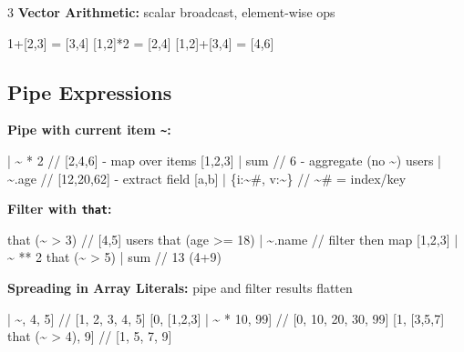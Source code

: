 \documentclass[8pt,landscape,a4paper,oneside]{article}
\newenvironment{Shaded}{%
  \begin{snugshade}%
  \vspace{0.4\baselineskip}%
  \fontsize{9}{10}\selectfont%
  \setlength{\parskip}{0pt}%
  \setlength{\topsep}{0pt}%
  \setlength{\partopsep}{0pt}%
}{%
  \vspace{0.01\baselineskip}%
  \end{snugshade}%
}
\newcommand{\NormalTok}[1]{#1}
\begin{document}
\begin{multicols*}{3}
\textbf{Vector Arithmetic:} scalar broadcast, element-wise ops

\begin{Shaded}
\begin{Highlighting}[]
\NormalTok{1+[2,3] = [3,4]  [1,2]*2 = [2,4]  [1,2]+[3,4] = [4,6]}
\end{Highlighting}
\end{Shaded}

\subsection{Pipe Expressions}\label{pipe-expressions}

\textbf{Pipe \texttt{\textbar{}} with current item
\texttt{\textasciitilde{}}:}

\begin{Shaded}
\begin{Highlighting}[]
\NormalTok{[1,2,3] | \textasciitilde{} * 2          // [2,4,6] {-} map over items}
\NormalTok{[1,2,3] | sum            // 6 {-} aggregate (no \textasciitilde{})}
\NormalTok{users | \textasciitilde{}.age            // [12,20,62] {-} extract field}
\NormalTok{[\textquotesingle{}a\textquotesingle{},\textquotesingle{}b\textquotesingle{}] | \{i:\textasciitilde{}\#, v:\textasciitilde{}\}  // \textasciitilde{}\# = index/key}
\end{Highlighting}
\end{Shaded}

\textbf{Filter with \texttt{that}:}

\begin{Shaded}
\begin{Highlighting}[]
\NormalTok{[1,2,3,4,5] that (\textasciitilde{} \textgreater{} 3)         // [4,5]}
\NormalTok{users that (age \textgreater{}= 18) | \textasciitilde{}.name  // filter then map}
\NormalTok{[1,2,3] | \textasciitilde{} ** 2 that (\textasciitilde{} \textgreater{} 5) | sum // 13 (4+9)}
\end{Highlighting}
\end{Shaded}

\textbf{Spreading in Array Literals:} pipe and filter results flatten

\begin{Shaded}
\begin{Highlighting}[]
\NormalTok{[1, [2,3] | \textasciitilde{}, 4, 5]           // [1, 2, 3, 4, 5]}
\NormalTok{[0, [1,2,3] | \textasciitilde{} * 10, 99]      // [0, 10, 20, 30, 99]}
\NormalTok{[1, [3,5,7] that (\textasciitilde{} \textgreater{} 4), 9]   // [1, 5, 7, 9]}
\end{Highlighting}
\end{Shaded}


\end{multicols*}
\end{document}

